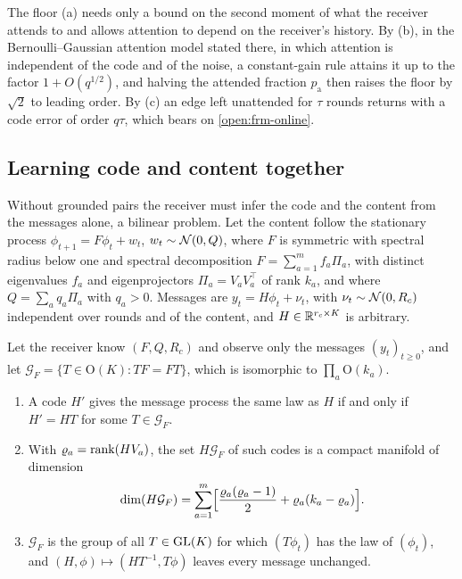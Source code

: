 The floor (a) needs only a bound on the second moment of what the receiver attends to and allows attention to depend on the receiver's history. By (b), in the Bernoulli--Gaussian attention model stated there, in which attention is independent of the code and of the noise, a constant-gain rule attains it up to the factor $1+O(q^{1/2})$, and halving the attended fraction $p_{\mathrm a}$ then raises the floor by $\sqrt2$ to leading order. By (c) an edge left unattended for $\tau$ rounds returns with a code error of order $q\tau$, which bears on \cref{open:frm-online}.

\subsection{Learning code and content together}\label{sec:lrn-joint}

Without grounded pairs the receiver must infer the code and the content from the messages alone, a bilinear problem. Let the content follow the stationary process $\phi_{t+1}=F\phi_t+w_t$, $w_t\sim\mathcal{N}(0,Q)$, where $F$ is symmetric with spectral radius below one and spectral decomposition $F=\sum_{a=1}^mf_a\Pi_a$, with distinct eigenvalues $f_a$ and eigenprojectors $\Pi_a=V_aV_a^\top$ of rank $k_a$, and where $Q=\sum_aq_a\Pi_a$ with $q_a>0$. Messages are $y_t=H\phi_t+\nu_t$, with $\nu_t\sim\mathcal{N}(0,R_c)$ independent over rounds and of the content, and $H\in\mathbb{R}^{r_c\times K}$ is arbitrary.

\begin{theorem}\label{thm:lrn-gauge}
Let the receiver know $(F,Q,R_c)$ and observe only the messages $(y_t)_{t\ge0}$, and let $\mathcal G_F=\{T\in\mathrm O(K):TF=FT\}$, which is isomorphic to $\prod_a\mathrm O(k_a)$.
\begin{enumerate}
\item[(a)] A code $H'$ gives the message process the same law as $H$ if and only if $H'=HT$ for some $T\in\mathcal G_F$.
\item[(b)] With $\varrho_a=\operatorname{rank}(HV_a)$, the set $H\mathcal G_F$ of such codes is a compact manifold of dimension
\begin{equation}\label{eq:lrn-orbit-dim}
\dim(H\mathcal G_F)=\sum_{a=1}^m\Bigl[\frac{\varrho_a(\varrho_a-1)}{2}+\varrho_a(k_a-\varrho_a)\Bigr].
\end{equation}
\item[(c)] $\mathcal G_F$ is the group of all $T\in\mathrm{GL}(K)$ for which $(T\phi_t)$ has the law of $(\phi_t)$, and $(H,\phi)\mapsto(HT^{-1},T\phi)$ leaves every message unchanged.
\end{enumerate}
\end{theorem}

